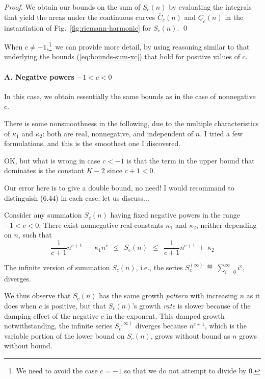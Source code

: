 \begin{proof}
We obtain our bounds on the sum of $S_c(n)$ by evaluating the integrals that yield the areas
under the continuous curves $\overline{C}_c(n)$ and $ \underline{C}_c(n)$ in the instantiation of Fig.~\ref{fig:riemann-harmonic} for $S_c(n)$.  \qed
\end{proof}

When $c \neq -1$,\footnote{We need to avoid the case $c = -1$ so that we do not attempt to divide by $0$.}~we can provide more detail, by using reasoning similar to that underlying the bounds (\ref{eq:bounds-sum-xc}) that hold for positive values of $c$.

\paragraph{A. Negative powers $-1 < c < 0$}

In this case, we obtain essentially the same bounds as in the case of nonnegative $c$.

{\Arny There is some nonsmoothness in the following, due to the multiple characteristics of $\kappa_1$ and $\kappa_2$: both are real, nonnegative, and independent of $n$.  I tried a few formulations, and this is the smoothest one I discovered.

OK, but what is wrong in case $c<-1$ is that the term in the upper bound that dominates is the constant $K-2$
since $c+1 < 0$.

Our error here is to give a double bound, no need!
I would recommand to distinguish (6.44) in each case, let us discuss...}

\begin{prop}
\label{thm:bounds-(-1)<c<0}
Consider any summation $S_c(n)$ having fixed negative powers in the range $-1 < c <0$.  There exist nonnegative real constants $\kappa_1$ and $\kappa_2$, neither depending on $n$, such that
\begin{equation}
\label{eq:bounds-(-1)<c<0}
 \frac{1}{c+1} n^{c+1} \ - \ \kappa_1 n^c
  \ \ \leq \ \ S_c(n)
  \ \ \leq \ \
\frac{1}{c+1} n^{c+1} \ + \ \kappa_2
\end{equation}

\noindent
The infinite version of summation $S_c(n)$, i.e., the series
$\displaystyle S_c^{(\infty)} \ \eqdef \ \sum_{i=0}^\infty i^c$,
diverges.
\end{prop}

We thus observe that $S_c(n)$ has the same growth {\em pattern} with increasing $n$ as it does when $c$ is positive, but that $S_c(n)$'s growth {\em rate} is slower because of the damping effect of the negative $c$ in the exponent.  This damped growth notwithstanding, the infinite series $S_c^{(\infty)}$ diverges because $n^{c+1}$, which is the variable portion of the lower bound on $S_c(n)$, grows without bound as $n$ grows without bound.

